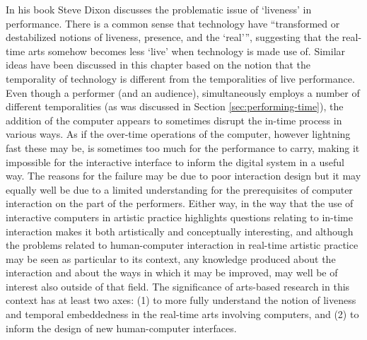 In his book  Steve Dixon discusses the problematic issue of `liveness' in performance. There is a common sense that technology have ``transformed or destabilized notions of liveness, presence, and the `real''', \parencite[127]{dixon07} suggesting that the real-time arts somehow becomes less `live' when technology is made use of. Similar ideas have been discussed in this chapter based on the notion that the temporality of technology is different from the temporalities of live performance. Even though a performer (and an audience), simultaneously employs a number of different temporalities (as was discussed in Section \ref{sec:performing-time}), the addition of the computer appears to sometimes disrupt the in-time process in various ways. As if the over-time operations of the computer, however lightning fast these may be, is sometimes too much for the performance to carry, making it impossible for the interactive interface to inform the digital system in a useful way. The reasons for the failure may be due to poor interaction design but it may equally well be due to a limited understanding for the prerequisites of computer interaction on the part of the performers. Either way, in the way that the use of interactive computers in artistic practice highlights questions relating to in-time interaction makes it both artistically and conceptually interesting, and although the problems related to human-computer interaction in real-time artistic practice may be seen as particular to its context, any knowledge produced about the interaction and about the ways in which it may be improved, may well be of interest also outside of that field. The significance of arts-based research in this context has at least two axes: (1) to more fully understand the notion of liveness and temporal embeddedness in the real-time arts involving computers, and (2) to inform the design of new human-computer interfaces.


